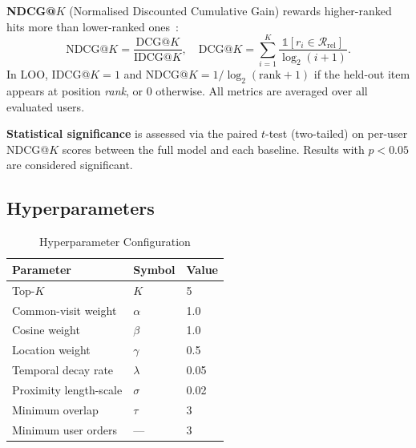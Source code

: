 \documentclass[conference]{IEEEtran}
\begin{document}
\textbf{NDCG@$K$} (Normalised Discounted Cumulative Gain) rewards
higher-ranked hits more than lower-ranked ones~\cite{jarvelin2002cumulated}:
\begin{equation}
  \text{NDCG@}K = \frac{\text{DCG@}K}{\text{IDCG@}K}, \quad
  \text{DCG@}K = \sum_{i=1}^{K} \frac{\mathbb{1}[r_i \in \mathcal{R}_{\text{rel}}]}
    {\log_2(i+1)}.
  \label{eq:ndcg}
\end{equation}
In LOO, IDCG@$K = 1$ and NDCG@$K = 1/\log_2(\text{rank}+1)$ if
the held-out item appears at position \emph{rank}, or 0 otherwise.
All metrics are averaged over all evaluated users.

\textbf{Statistical significance} is assessed via the paired $t$-test
(two-tailed) on per-user NDCG@$K$ scores between the full model and
each baseline.  Results with $p < 0.05$ are considered significant.

\subsection{Hyperparameters}
\begin{table}[h]
\centering
\caption{Hyperparameter Configuration}
\label{tab:hyperparams}
\begin{tabular}{lll}
\toprule
\textbf{Parameter} & \textbf{Symbol} & \textbf{Value} \\
\midrule
Top-$K$              & $K$           & 5       \\
Common-visit weight  & $\alpha$      & 1.0     \\
Cosine weight        & $\beta$       & 1.0     \\
Location weight      & $\gamma$      & 0.5     \\
Temporal decay rate  & $\lambda$     & 0.05    \\
Proximity length-scale & $\sigma$    & 0.02    \\
Minimum overlap      & $\tau$        & 3       \\
Minimum user orders  & ---           & 3       \\
\bottomrule
\end{tabular}
\end{table}
\end{document}
